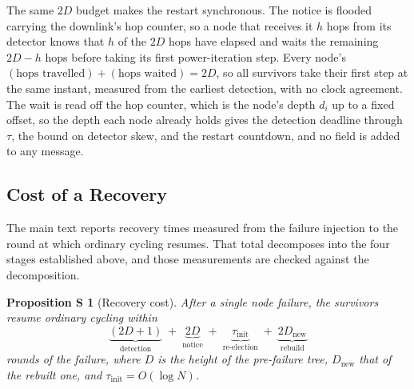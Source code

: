 \documentclass[letterpaper]{article} %
\newtheorem{sproposition}{Proposition S}
\begin{document}
The same $2D$ budget makes the restart synchronous. The notice is flooded
carrying the downlink's hop counter, so a node that receives it $h$ hops from its
detector knows that $h$ of the $2D$ hops have elapsed and waits the remaining
$2D-h$ hops before taking its first power-iteration step. Every node's
$(\text{hops travelled}) + (\text{hops waited}) = 2D$, so all survivors take
their first step at the same instant, measured from the earliest detection, with
no clock agreement. The wait is read off the hop counter, which is the node's
depth $d_i$ up to a fixed offset, so the depth each node already holds gives
the detection deadline through $\tau$, the bound on detector skew, and the
restart countdown, and no field is added to any message.

\subsection{Cost of a Recovery}
\label{sec:recovery-cost}

The main text reports recovery times measured from the failure injection to
the round at which ordinary cycling resumes. That total decomposes into the
four stages established above, and those measurements are checked against the
decomposition.

\begin{sproposition}[Recovery cost]
\label{prop:recovery-cost}
After a single node failure, the survivors resume ordinary cycling within
\[
\underbrace{(2D+1)}_{\text{detection}} \;+\; \underbrace{2D}_{\text{notice}}
\;+\; \underbrace{\tau_{\mathrm{init}}}_{\text{re-election}}
\;+\; \underbrace{2D_{\mathrm{new}}}_{\text{rebuild}}
\]
rounds of the failure, where $D$ is the height of the pre-failure tree,
$D_{\mathrm{new}}$ that of the rebuilt one, and $\tau_{\mathrm{init}} =
O(\log N)$.
\end{sproposition}
\end{document}

